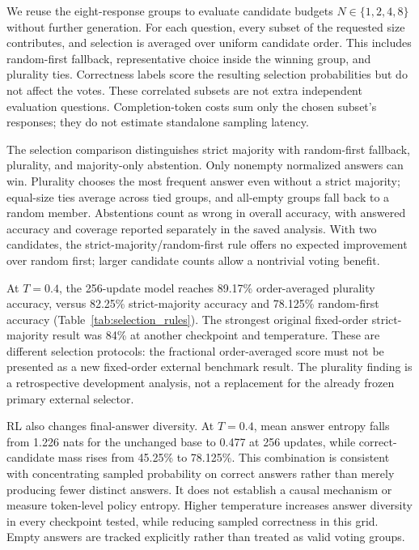 \documentclass[conference]{IEEEtran}
\begin{document}
We reuse the eight-response groups to evaluate candidate budgets $N\in\{1,2,4,8\}$ without further generation. For each question, every subset of the requested size contributes, and selection is averaged over uniform candidate order. This includes random-first fallback, representative choice inside the winning group, and plurality ties. Correctness labels score the resulting selection probabilities but do not affect the votes. These correlated subsets are not extra independent evaluation questions. Completion-token costs sum only the chosen subset's responses; they do not estimate standalone sampling latency.

The selection comparison distinguishes strict majority with random-first fallback, plurality, and majority-only abstention. Only nonempty normalized answers can win. Plurality chooses the most frequent answer even without a strict majority; equal-size ties average across tied groups, and all-empty groups fall back to a random member. Abstentions count as wrong in overall accuracy, with answered accuracy and coverage reported separately in the saved analysis. With two candidates, the strict-majority/random-first rule offers no expected improvement over random first; larger candidate counts allow a nontrivial voting benefit.

At $T=0.4$, the 256-update model reaches 89.17\% order-averaged plurality accuracy, versus 82.25\% strict-majority accuracy and 78.125\% random-first accuracy (Table~\ref{tab:selection_rules}). The strongest original fixed-order strict-majority result was 84\% at another checkpoint and temperature. These are different selection protocols: the fractional order-averaged score must not be presented as a new fixed-order external benchmark result. The plurality finding is a retrospective development analysis, not a replacement for the already frozen primary external selector.

RL also changes final-answer diversity. At $T=0.4$, mean answer entropy falls from 1.226 nats for the unchanged base to 0.477 at 256 updates, while correct-candidate mass rises from 45.25\% to 78.125\%. This combination is consistent with concentrating sampled probability on correct answers rather than merely producing fewer distinct answers. It does not establish a causal mechanism or measure token-level policy entropy. Higher temperature increases answer diversity in every checkpoint tested, while reducing sampled correctness in this grid. Empty answers are tracked explicitly rather than treated as valid voting groups.
\end{document}
